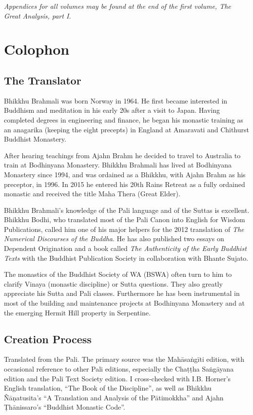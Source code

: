 \documentclass[12pt,openany]{book}%
\begin{document}
\emph{Appendices for all volumes may be found at the end of the first volume, The Great Analysis, part I.}

%
\chapter*{Colophon}

\section*{The Translator}

Bhikkhu Brahmali was born Norway in 1964. He first became interested in Buddhism and meditation in his early 20s after a visit to Japan. Having completed degrees in engineering and finance, he began his monastic training as an anagarika (keeping the eight precepts) in England at Amaravati and Chithurst Buddhist Monastery.

After hearing teachings from Ajahn Brahm he decided to travel to Australia to train at Bodhinyana Monastery. Bhikkhu Brahmali has lived at Bodhinyana Monastery since 1994, and was ordained as a Bhikkhu, with Ajahn Brahm as his preceptor, in 1996. In 2015 he entered his 20th Rains Retreat as a fully ordained monastic and received the title Maha Thera (Great Elder).

Bhikkhu Brahmali’s knowledge of the Pali language and of the Suttas is excellent. Bhikkhu Bodhi, who translated most of the Pali Canon into English for Wisdom Publications, called him one of his major helpers for the 2012 translation of \emph{The Numerical Discourses of the Buddha}. He has also published two essays on Dependent Origination and a book called \emph{The Authenticity of the Early Buddhist Texts} with the Buddhist Publication Society in collaboration with Bhante Sujato.

The monastics of the Buddhist Society of WA (BSWA) often turn to him to clarify Vinaya (monastic discipline) or Sutta questions. They also greatly appreciate his Sutta and Pali classes. Furthermore he has been instrumental in most of the building and maintenance projects at Bodhinyana Monastery and at the emerging Hermit Hill property in Serpentine.

\section*{Creation Process}

Translated from the Pali. The primary source was the \textsanskrit{Mahāsaṅgīti} edition, with occasional reference to other Pali editions, especially the \textsanskrit{Chaṭṭha} \textsanskrit{Saṅgāyana} edition and the Pali Text Society edition. I cross-checked with I.B. Horner’s English translation, “The Book of the Discipline”, as well as Bhikkhu \textsanskrit{Ñāṇatusita}’s “A Translation and Analysis of the \textsanskrit{Pātimokkha}” and Ajahn \textsanskrit{Ṭhānissaro}’s “Buddhist Monastic Code”.
\end{document}
